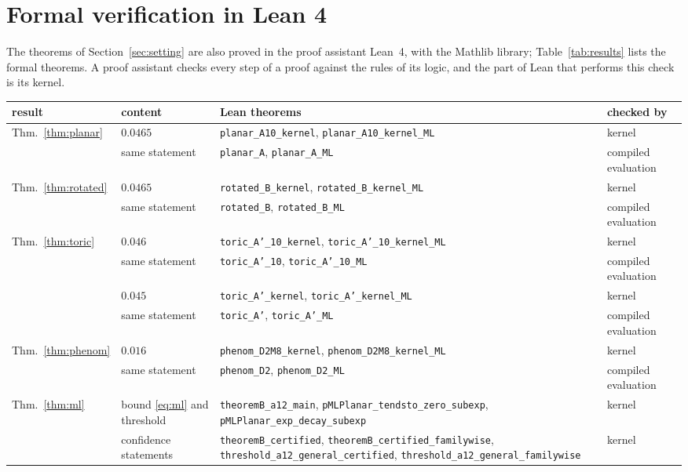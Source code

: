 \documentclass[11pt]{amsart}
\theoremstyle{definition}
\theoremstyle{remark}
\numberwithin{equation}{section}
\begin{document}
\section{Formal verification in Lean 4}\label{sec:lean}

The theorems of Section~\ref{sec:setting} are also proved in the proof assistant Lean~4, with the Mathlib library;
Table~\ref{tab:results} lists the formal theorems. A proof assistant checks every step of a
proof against the rules of its logic, and the part of Lean that performs this check is its kernel.

\begin{table}[t]
\centering
\small
\begin{tabular}{@{}p{}>{\raggedright\arraybackslash}p{}>{\raggedright\arraybackslash}p{}l@{}}
\toprule
result & content & Lean theorems & checked by \\
\midrule
Thm.~\ref{thm:planar} & $0.0465$ & \texttt{planar\_A10\_kernel}, \texttt{planar\_A10\_kernel\_ML} & kernel \\
 & same statement & \texttt{planar\_A}, \texttt{planar\_A\_ML} & compiled evaluation \\
Thm.~\ref{thm:rotated} & $0.0465$ & \texttt{rotated\_B\_kernel}, \texttt{rotated\_B\_kernel\_ML} & kernel \\
 & same statement & \texttt{rotated\_B}, \texttt{rotated\_B\_ML} & compiled evaluation \\
Thm.~\ref{thm:toric} & $0.046$ & \texttt{toric\_A'\_10\_kernel}, \texttt{toric\_A'\_10\_kernel\_ML} & kernel \\
 & same statement & \texttt{toric\_A'\_10}, \texttt{toric\_A'\_10\_ML} & compiled evaluation \\
 & $0.045$ & \texttt{toric\_A'\_kernel}, \texttt{toric\_A'\_kernel\_ML} & kernel \\
 & same statement & \texttt{toric\_A'}, \texttt{toric\_A'\_ML} & compiled evaluation \\
Thm.~\ref{thm:phenom} & $0.016$ & \texttt{phenom\_D2M8\_kernel}, \texttt{phenom\_D2M8\_kernel\_ML} & kernel \\
 & same statement & \texttt{phenom\_D2}, \texttt{phenom\_D2\_ML} & compiled evaluation \\
Thm.~\ref{thm:ml} & bound \eqref{eq:ml} and threshold & \texttt{theoremB\_a12\_main}, \texttt{pMLPlanar\_tendsto\_zero\_subexp}, \texttt{pMLPlanar\_exp\_decay\_subexp} & kernel \\
 & confidence statements & \texttt{theoremB\_certified}, \texttt{theoremB\_certified\_familywise}, \texttt{threshold\_a12\_general\_certified}, \texttt{threshold\_a12\_general\_familywise} & kernel \\

\end{tabular}
\end{table}
\end{document}
